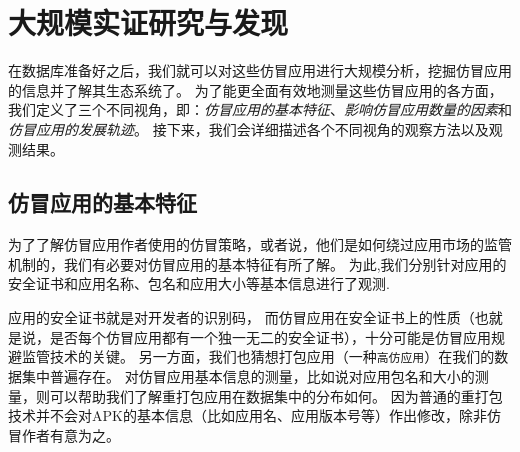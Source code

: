 \chapter{大规模实证研究与发现}
\label{chp:discoveries}

在数据库准备好之后，我们就可以对这些仿冒应用进行大规模分析，挖掘仿冒应用的信息并了解其生态系统了。
为了能更全面有效地测量这些仿冒应用的各方面，我们定义了三个不同视角，即：\emph{仿冒应用的基本特征}、\emph{影响仿冒应用数量的因素}和\emph{仿冒应用的发展轨迹}。
接下来，我们会详细描述各个不同视角的观察方法以及观测结果。

\section{仿冒应用的基本特征}
\label{sec:fakeCharacteristics}
为了了解仿冒应用作者使用的仿冒策略，或者说，他们是如何绕过应用市场的监管机制的，我们有必要对仿冒应用的基本特征有所了解。
为此,我们分别针对应用的安全证书和应用名称、包名和应用大小等基本信息进行了观测.

应用的安全证书就是对开发者的识别码，
而仿冒应用在安全证书上的性质（也就是说，是否每个仿冒应用都有一个独一无二的安全证书），十分可能是仿冒应用规避监管技术的关键。
另一方面，我们也猜想打包应用（一种\texttt{高仿应用}）在我们的数据集中普遍存在。
对仿冒应用基本信息的测量，比如说对应用包名和大小的测量，则可以帮助我们了解重打包应用在数据集中的分布如何。
因为普通的重打包技术并不会对APK的基本信息（比如应用名、应用版本号等）作出修改，除非仿冒作者有意为之。

